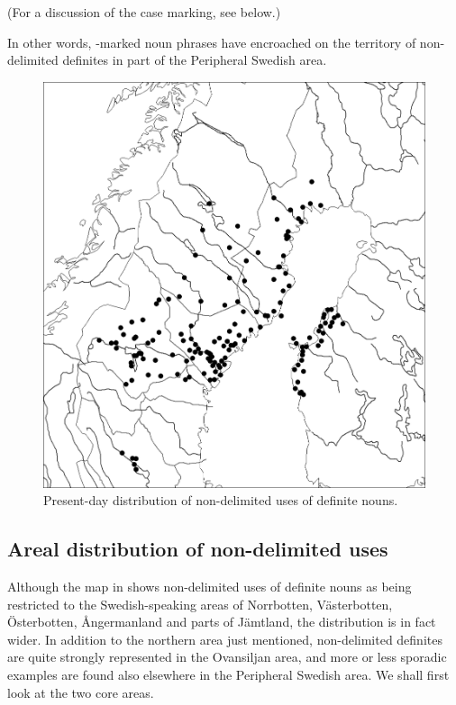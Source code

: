 \z

(For a discussion of the case marking, see  below.) 

In other words, -marked noun phrases have encroached on the territory of non-delimited definites in part of the Peripheral Swedish area. 

\begin{figure}[h]
\includegraphics[height=.3\textheight]{figures/13_PresentDayDistribution}
\caption{Present-day distribution of non-delimited uses of definite nouns.}
\label{map:11}

\end{figure}

\subsection{ Areal distribution of non-delimited uses}

Although the map in \citet{Delsing2003a} shows non-delimited uses of definite nouns as being restricted to the Swedish-speaking areas of Norrbotten, Västerbotten, Österbotten, Ångermanland and parts of Jämtland, the distribution is in fact wider. In addition to the northern area just mentioned, non-delimited definites are quite strongly represented in the Ovansiljan area, and more or less sporadic examples are found also elsewhere in the Peripheral Swedish area. We shall first look at the two core areas.

